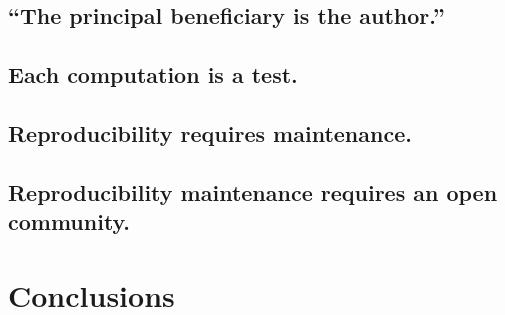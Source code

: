 \subsection{``The principal beneficiary is the author.''}

\subsection{Each computation is a test.}

\subsection{Reproducibility requires maintenance.}

\subsection{Reproducibility maintenance requires an open community.}

\section{Conclusions}

